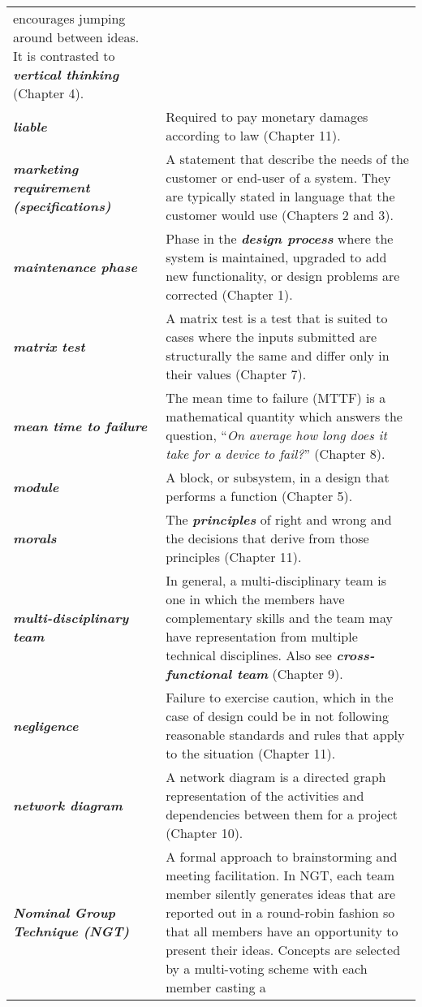 \begin{longtable}[]{@{}
  >{\raggedright\arraybackslash}p{}
  >{\raggedright\arraybackslash}p{}@{}}
encourages jumping around be­tween ideas. It is contrasted to
\emph{\textbf{vertical thinking}} (Chapter 4). \\
\emph{\textbf{liable}} & Required to pay monetary damages according to
law (Chapter 11). \\
\emph{\textbf{marketing requirement (specifications)}} & A statement
that describe the needs of the customer or end-user of a system. They
are typically stated in language that the customer would use (Chapters 2
and 3). \\
\emph{\textbf{maintenance phase}} & Phase in the \emph{\textbf{design
process}} where the system is maintained, upgraded to add new
functionality, or design problems are corrected (Chapter 1). \\
\emph{\textbf{matrix test}} & A matrix test is a test that is suited to
cases where the inputs submitted are structurally the same and differ
only in their values (Chapter 7). \\
\emph{\textbf{mean time to failure}} & The mean time to failure (MTTF)
is a mathematical quantity which answers the question, ``\emph{On
average how long does it take for a device to fail?}'' (Chapter 8). \\
\emph{\textbf{module}} & A block, or subsystem, in a design that
performs a function (Chapter 5). \\
\emph{\textbf{morals}} & The \emph{\textbf{principles}} of right and
wrong and the decisions that derive from those principles (Chapter
11). \\
\emph{\textbf{multi-disciplinary team}} & In general, a
multi-disciplinary team is one in which the members have complementary
skills and the team may have representation from multiple technical
disciplines. Also see \emph{\textbf{cross-functional team}} (Chapter
9). \\
\emph{\textbf{negligence}} & Failure to exercise caution, which in the
case of design could be in not following reasonable standards and rules
that apply to the situation (Chapter 11). \\
\emph{\textbf{network diagram}} & A network diagram is a directed graph
representation of the activities and dependencies between them for a
project (Chapter 10). \\
\emph{\textbf{Nominal Group Technique (NGT)}} & A formal approach to
brainstorming and meeting facilitation. In NGT, each team member
silently generates ideas that are reported out in a round-robin fashion
so that all members have an opportunity to present their ideas. Concepts
are selected by a multi-voting scheme with each member casting a

\end{longtable}
